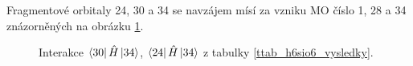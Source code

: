 \documentclass[
  digital, %
  table,   %
  lof,     %
  lot,     %
]{fithesis3}
\begin{document}
Fragmentové orbitaly  24, 30 a 34 se navzájem mísí za vzniku MO číslo 1, 28 a 34 znázorněných na obrázku \ref{obr_h6sio6_vysledky_I}.   
\begin{figure}
\begin{center}
\caption{Interakce $\bra{30}{\hat{H}}\ket{34}$, $\bra{24}{\hat{H}}\ket{34}$  z tabulky \ref{ttab_h6sio6_vysledky}.}

\label{obr_h6sio6_vysledky_I}\end{center}
\end{figure} 
\end{document}
